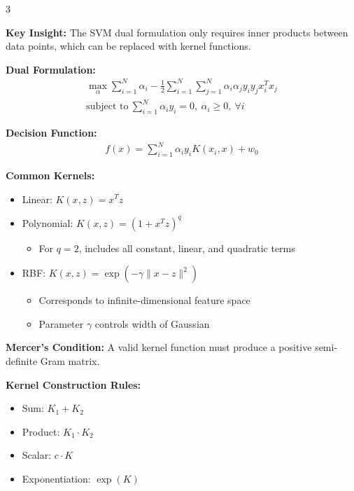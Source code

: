 \documentclass[10pt,landscape]{article}
\begin{document}
\begin{multicols}{3}
\begin{tcolorbox}[breakable, title=4.2 The Kernel Trick, colback=svm,boxsep=1pt,left=1pt,right=1pt,top=1pt,bottom=1pt]
\textbf{Key Insight:} The SVM dual formulation only requires inner products between data points, which can be replaced with kernel functions.

\textbf{Dual Formulation:}
\begin{align}
\max_{\alpha} \sum_{i=1}^N \alpha_i - \frac{1}{2}\sum_{i=1}^N\sum_{j=1}^N \alpha_i\alpha_j y_i y_j x_i^T x_j \\
\text{subject to}~\sum_{i=1}^N \alpha_i y_i = 0,~\alpha_i \geq 0,~\forall i
\end{align}

\textbf{Decision Function:}
\begin{align}
f(x) = \sum_{i=1}^N \alpha_i y_i K(x_i, x) + w_0
\end{align}

\textbf{Common Kernels:}
\begin{itemize}[leftmargin=*,noitemsep,topsep=0pt]
    \item Linear: $K(x,z) = x^Tz$
    \item Polynomial: $K(x,z) = (1 + x^Tz)^q$
    \begin{itemize}[leftmargin=*,noitemsep]
        \item For $q=2$, includes all constant, linear, and quadratic terms
    \end{itemize}
    \item RBF: $K(x,z) = \exp(-\gamma\|x-z\|^2)$
    \begin{itemize}[leftmargin=*,noitemsep]
        \item Corresponds to infinite-dimensional feature space
        \item Parameter $\gamma$ controls width of Gaussian
    \end{itemize}
\end{itemize}

\textbf{Mercer's Condition:} A valid kernel function must produce a positive semi-definite Gram matrix.

\textbf{Kernel Construction Rules:}
\begin{itemize}[leftmargin=*,noitemsep,topsep=0pt]
    \item Sum: $K_1 + K_2$
    \item Product: $K_1 \cdot K_2$
    \item Scalar: $c \cdot K$
    \item Exponentiation: $\exp(K)$
\end{itemize}
\end{tcolorbox}


\end{multicols}
\end{document}
